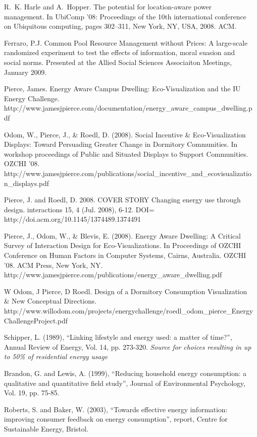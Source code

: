 R. K. Harle and A. Hopper. The potential for location-aware power management. In UbiComp ’08: Proceedings of the 10th international conference on Ubiquitous computing, pages 302–311, New York, NY, USA, 2008. ACM.

Ferraro, P.J. Common Pool Resource Management without Prices:  A large-scale randomized experiment to test the effects of information, moral suasion and social norms. Presented at the Allied Social Sciences Associaiton Meetings, January 2009.

Pierce, James. Energy Aware Campus Dwelling: Eco-Visualization and the IU Energy Challenge. http://www.jamesjpierce.com/documentation/energy_aware_campus_dwelling.pdf

Odom, W., Pierce, J., & Roedl, D. (2008). Social Incentive & Eco-Visualization Displays: Toward Persuading Greater Change in Dormitory Communities. In workshop proceedings of Public and Situated Displays to Support Communities. OZCHI '08. http://www.jamesjpierce.com/publications/social_incentive_and_ecovisualization_displays.pdf

Pierce, J. and Roedl, D. 2008. COVER STORY
Changing energy use through design. interactions 15, 4 (Jul. 2008), 6-12. DOI= http://doi.acm.org/10.1145/1374489.1374491

Pierce, J., Odom, W., & Blevis, E. (2008). Energy Aware Dwelling: A Critical Survey of Interaction Design for Eco-Visualizations. In Proceedings of OZCHI Conference on Human Factors in Computer Systems, Cairns, Australia. OZCHI '08. ACM Press, New York, NY. http://www.jamesjpierce.com/publications/energy_aware_dwelling.pdf

W Odom, J Pierce, D Roedl. Design of a Dormitory Consumption Visualization & New Conceptual Directions. http://www.willodom.com/projects/energychallenge/roedl_odom_pierce_EnergyChallengeProject.pdf

Schipper, L. (1989), “Linking lifestyle and energy used: a matter of time?”, Annual Review of Energy, Vol. 14, pp. 273-320. \emph{Source for choices resulting in up to 50\% of residential energy usage}

Brandon, G. and Lewis, A. (1999), ``Reducing household energy consumption: a qualitative and quantitative ﬁeld study'', Journal of Environmental Psychology, Vol. 19, pp. 75-85.

Roberts, S. and Baker, W. (2003), “Towards effective energy information: improving consumer feedback on energy consumption”, report, Centre for Sustainable Energy, Bristol. 


